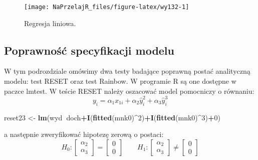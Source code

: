 \documentclass[polish,]{book}
\newenvironment{Shaded}{\begin{snugshade}}{\end{snugshade}}
\newcommand{\DecValTok}[1]{\textcolor[rgb]{0.00,0.00,0.81}{#1}}
\newcommand{\KeywordTok}[1]{\textcolor[rgb]{0.13,0.29,0.53}{\textbf{#1}}}
\newcommand{\NormalTok}[1]{#1}
\newcommand{\OperatorTok}[1]{\textcolor[rgb]{0.81,0.36,0.00}{\textbf{#1}}}
\newcommand{\StringTok}[1]{\textcolor[rgb]{0.31,0.60,0.02}{#1}}
\begin{document}
\begin{figure}[h]

{\centering \texttt{[image: NaPrzelajR\_files/figure-latex/wy132-1]} 

}

\caption{Regresja liniowa.}\label{fig:wy132}
\end{figure}

\hypertarget{part_13.2.2}{%
\subsection{Poprawność specyfikacji modelu}\label{part_13.2.2}}

W tym podrozdziale omówimy dwa testy badające poprawną postać analityczną
modelu: test RESET oraz test Rainbow. W programie R są one dostępne w paczce
lmtest. W teście RESET należy oszacować model pomocniczy o równaniu:
\begin{equation}
y_i=\alpha_1x_{1i}+\alpha_2\hat{y}_i^2+\alpha_3\hat{y}_i^3
\label{eq:wz135}
\end{equation}

\begin{Shaded}
\begin{Highlighting}[]
\NormalTok{reset23 <-}\StringTok{ }\KeywordTok{lm}\NormalTok{(wyd}\OperatorTok{~}\NormalTok{doch}\OperatorTok{+}\KeywordTok{I}\NormalTok{(}\KeywordTok{fitted}\NormalTok{(mnk0)}\OperatorTok{^}\DecValTok{2}\NormalTok{)}\OperatorTok{+}\KeywordTok{I}\NormalTok{(}\KeywordTok{fitted}\NormalTok{(mnk0)}\OperatorTok{^}\DecValTok{3}\NormalTok{)}\OperatorTok{+}\DecValTok{0}\NormalTok{)}
\end{Highlighting}
\end{Shaded}

a następnie zweryfikować hipotezę zerową o postaci:
\begin{equation*}
H_{0}:
\left[
\begin{array}{c}
\alpha_{2} \\[1mm]
\alpha_{3}
\end{array}
\right]
=
\left[
\begin{array}{c}
0 \\[1mm]
0
\end{array}
\right]
\qquad
H_1:
\left[
\begin{array}{c}
\alpha_{2} \\[1mm]
\alpha_{3}
\end{array}
\right]
\neq
\left[
\begin{array}{c}
0 \\[1mm]
0
\end{array}
\right]
\end{equation*}
\end{document}
